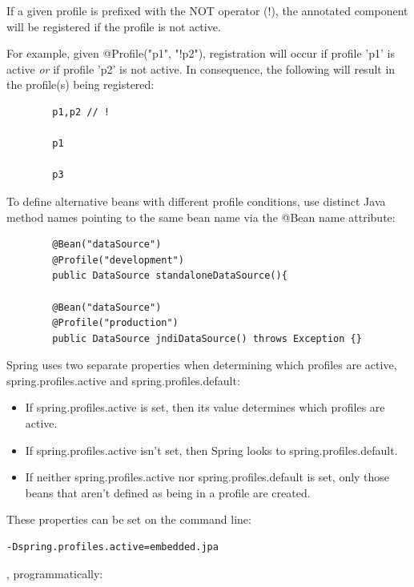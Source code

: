 \documentclass{scrartcl}
\begin{document}
    If a given profile is prefixed with the NOT operator (!), the annotated component will be registered if the profile is not active.

    For example, given @Profile({"p1", "!p2"}), registration will occur if profile 'p1' is active \textit{or} if profile 'p2' is not active.
    In consequence, the following will result in the profile(s) being registered:

    \begin{lstlisting}
        p1,p2 // !

        p1

        p3

    \end{lstlisting}

    To define alternative beans with different profile conditions, use distinct Java method names pointing to the same bean name via the @Bean name attribute:

    \begin{lstlisting}
        @Bean("dataSource")
        @Profile("development")
        public DataSource standaloneDataSource(){

        @Bean("dataSource")
        @Profile("production")
        public DataSource jndiDataSource() throws Exception {}

    \end{lstlisting}

   Spring uses two separate properties when determining which profiles are active, spring.profiles.active and spring.profiles.default:

    \begin{itemize}
       \item If spring.profiles.active is set,  then its value determines which profiles are active.
       \item If spring.profiles.active isn’t set, then Spring looks to spring.profiles.default.
       \item If neither spring.profiles.active nor spring.profiles.default is set, only those beans that aren’t defined as being in a profile are created.
    \end{itemize}

   These properties can be set on the command line:

   \begin{lstlisting}[language=bash]
       -Dspring.profiles.active=embedded.jpa
   \end{lstlisting}

   , programmatically:
\end{document}
